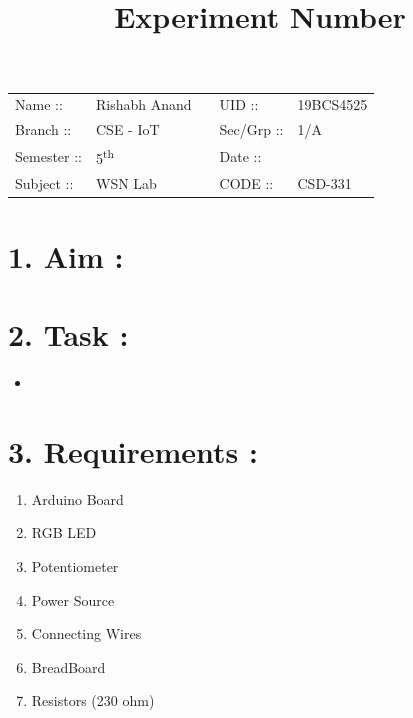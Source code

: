 \documentclass[14pt]{extarticle}
\title{%
    \textbf{
    \vspace{-3em} \\ 
    \Large Experiment Number \\
    \vspace{-4em}
    }
}
\author{}
\date{}
\begin{document}
\maketitle %

\section*{}
    \begin{tabular}{ llp{2cm}ll } 
        Name :: & Rishabh Anand & & UID :: & 19BCS4525  \\ 
        Branch :: & CSE - IoT & & Sec/Grp :: & 1/A \\ 
        Semester :: & 5\textsuperscript{th} & & Date :: & \shortdate{\today} \\
        Subject :: & WSN Lab & & CODE :: & CSD-331  \\ 
    \end{tabular}
    
\vspace{1em}

\section*{\normalsize 1. Aim :}

\section*{\normalsize 2. Task :}

\begin{itemize}
  \item 
\end{itemize}

\section*{\normalsize 3. Requirements :}

\begin{enumerate}
  \item Arduino Board
  \item RGB LED
  \item Potentiometer
  \item Power Source
  \item Connecting Wires
  \item BreadBoard
  \item Resistors (230 ohm)
\end{enumerate}
\end{document}
